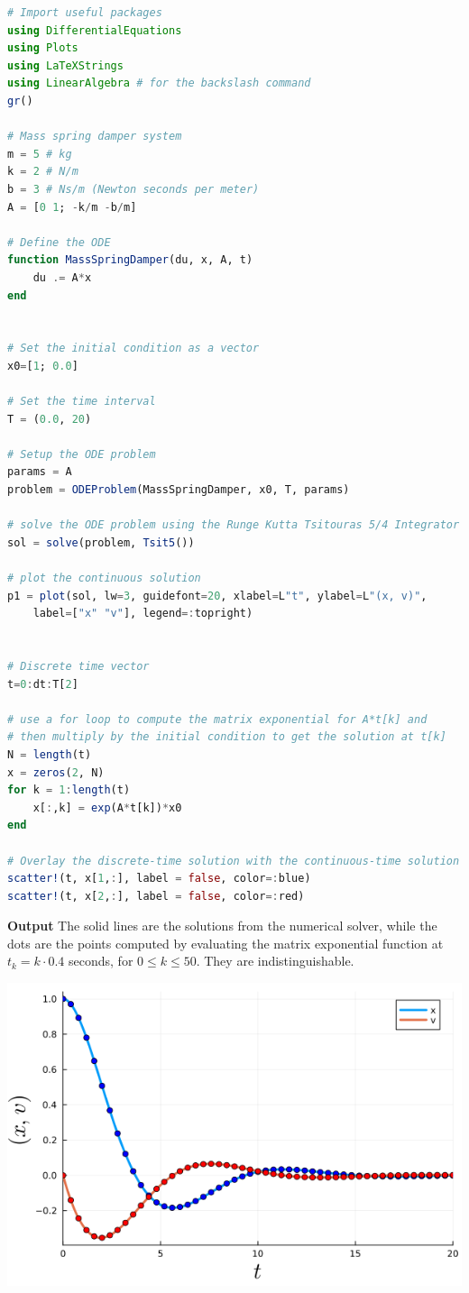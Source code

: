 \begin{lstlisting}[language=Julia,style=mystyle]
# Import useful packages
using DifferentialEquations
using Plots 
using LaTeXStrings
using LinearAlgebra # for the backslash command
gr()

# Mass spring damper system
m = 5 # kg
k = 2 # N/m
b = 3 # Ns/m (Newton seconds per meter)
A = [0 1; -k/m -b/m]

# Define the ODE
function MassSpringDamper(du, x, A, t) 
    du .= A*x
end


# Set the initial condition as a vector
x0=[1; 0.0]

# Set the time interval
T = (0.0, 20) 

# Setup the ODE problem
params = A 
problem = ODEProblem(MassSpringDamper, x0, T, params)

# solve the ODE problem using the Runge Kutta Tsitouras 5/4 Integrator
sol = solve(problem, Tsit5())

# plot the continuous solution
p1 = plot(sol, lw=3, guidefont=20, xlabel=L"t", ylabel=L"(x, v)", 
    label=["x" "v"], legend=:topright)


# Discrete time vector
t=0:dt:T[2]

# use a for loop to compute the matrix exponential for A*t[k] and
# then multiply by the initial condition to get the solution at t[k]
N = length(t)
x = zeros(2, N)
for k = 1:length(t)
    x[:,k] = exp(A*t[k])*x0
end

# Overlay the discrete-time solution with the continuous-time solution
scatter!(t, x[1,:], label = false, color=:blue)
scatter!(t, x[2,:], label = false, color=:red)
\end{lstlisting}
\textbf{Output} 
The solid lines are the solutions from the numerical solver, while the dots are the points computed by evaluating the matrix exponential function at $t_k = k \cdot 0.4$ seconds, for $0 \le k \le 50$. They are indistinguishable.
\begin{center}
    \includegraphics[width=0.6\columnwidth]{graphics/Chap09/MassSpringDamperComparisonSimulationChap09.png}
\end{center}
\Qed

